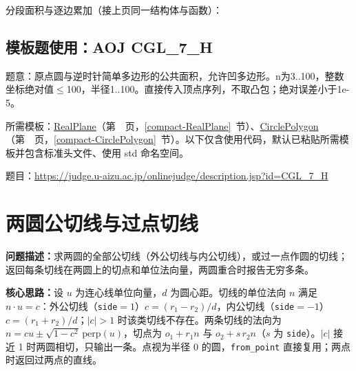 \Needspace{387pt}



\newpage

\noindent 分段面积与逐边累加（接上页同一结构体与函数）：



\Needspace{288pt}

\subsection*{模板题使用：AOJ CGL\_7\_H}

\label{usage-example-153}

题意：原点圆与逆时针简单多边形的公共面积，允许凹多边形。n为3..100，整数坐标绝对值$\le$100，半径1..100。直接传入顶点序列，不取凸包；绝对误差小于1e-5。

所需模板：\hyperref[compact-RealPlane]{RealPlane}（第~\pageref{compact-RealPlane}~页，\ref{compact-RealPlane}~节）、\hyperref[compact-CirclePolygon]{CirclePolygon}（第~\pageref{compact-CirclePolygon}~页，\ref{compact-CirclePolygon}~节）。以下仅含使用代码，默认已粘贴所需模板并包含标准头文件、使用 std 命名空间。

题目：\url{https://judge.u-aizu.ac.jp/onlinejudge/description.jsp?id=CGL_7_H}



\Needspace{583pt}

\section{两圆公切线与过点切线}\label{compact-CircleTangents}

\noindent\textbf{问题描述：}\allowbreak 求两圆的全部公切线（外公切线与内公切线），或过一点作圆的切线；返回每条切线在两圆上的切点和单位法向量，两圆重合时报告无穷多条。

\textbf{核心思路：}\allowbreak 设 $u$ 为连心线单位向量，$d$ 为圆心距。切线的单位法向 $n$ 满足 $n\cdot u=c$：外公切线（\texttt{side}$=1$）$c=(r_1-r_2)/d$，内公切线（\texttt{side}$=-1$）$c=(r_1+r_2)/d$；$|c|>1$ 时该类切线不存在。两条切线的法向为 $n=cu\pm\sqrt{1-c^2}\,\mathrm{perp}(u)$，切点为 $o_1+r_1n$ 与 $o_2+s\,r_2n$（$s$ 为 \texttt{side}）。$|c|$ 接近 1 时两圆相切，只输出一条。点视为半径 0 的圆，\texttt{from\_point} 直接复用；两点时返回过两点的直线。

